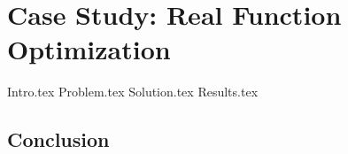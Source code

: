 \chapter{Case Study: Real Function Optimization}
\label{chap:fn_opt}
  {Intro.tex}
  {Problem.tex}
  {Solution.tex}
  {Results.tex}
  \section{Conclusion}
  \label{sec:fn_opt:conclusion}
    \Blindtext

